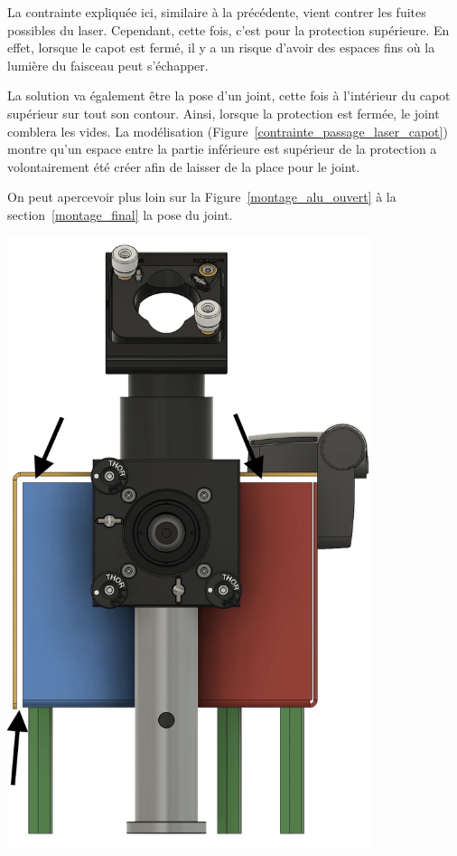 \begin{minipage}[c]{0.6\textwidth}
    La contrainte expliquée ici, similaire à la précédente, vient contrer les fuites possibles du laser. Cependant, cette fois, c'est pour la protection supérieure. En effet, lorsque le capot est fermé, il y a un risque d'avoir des espaces fins où la lumière du faisceau peut s'échapper.

    La solution va également être la pose d'un joint, cette fois à l'intérieur du capot supérieur sur tout son contour. Ainsi, lorsque la protection est fermée, le joint comblera les vides. La modélisation (Figure~\ref{contrainte_passage_laser_capot}) montre qu'un espace entre la partie inférieure est supérieur de la protection a volontairement été créer afin de laisser de la place pour le joint.

    On peut apercevoir plus loin sur la Figure~\ref{montage_alu_ouvert} à la section~\ref{montage_final} la pose du joint.
\end{minipage}\hfill
\begin{minipage}[c]{0.38\textwidth}
    \begin{center}
        \includegraphics[width=0.8\textwidth]{assets/figures/Protections_laser/Securite_mecanique/Protection_entree_laser/contrainte_passage_laser_capot.jpeg}
    \end{center}
    \label{contrainte_passage_laser_capot}
\end{minipage}

